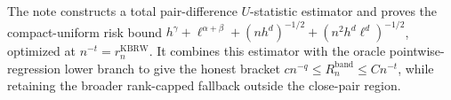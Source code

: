 The note constructs a total pair-difference \(U\)-statistic estimator and proves the compact-uniform risk bound \(h^\gamma+\ell^{\alpha+\beta}+(nh^d)^{-1/2}+(n^2h^d\ell^d)^{-1/2}\), optimized at \(n^{-t}=r_n^{\mathrm{KBRW}}\).  It combines this estimator with the oracle pointwise-regression lower branch to give the honest bracket \(c n^{-q}\leq R_n^{\mathrm{band}}\leq Cn^{-t}\), while retaining the broader rank-capped fallback outside the close-pair region.